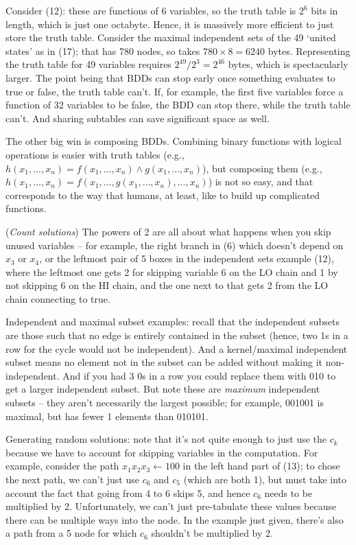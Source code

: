 Consider (12): these are functions of 6 variables, so the truth table is $2^6$ bits
in length, which is just one octabyte.  Hence, it is massively more efficient
to just store the truth table.  Consider the maximal independent sets of the
49 `united states' as in (17); that has 780 nodes, so takes $780 \times 8 = 6240$
bytes.  Representing the truth table for 49 variables requires $2^49 / 2^3 = 2^46$
bytes, which is spectacularly larger.  The point being that BDDs can stop early
once something evaluates to true or false, the truth table can't.  If, for example,
the first five variables force a function of 32 variables to be false, the BDD
can stop there, while the truth table can't.  And sharing subtables can save
significant space as well.

The other big win is composing BDDs.  Combining binary functions with
logical operations is easier with truth tables (e.g., $h\left(x_1, \ldots, x_n\right)
= f\left(x_1, \ldots, x_n\right) \land g\left(x_1, \ldots, x_n\right)$), but
composing them (e.g., $h\left(x_1, \ldots, x_n\right) = f\left(x_1, \ldots,
g\left(x_1, \ldots, x_n\right), \ldots, x_n\right)$) is not so easy, and 
that corresponds to the way that humans, at least, like to build up complicated
functions.

\vskip 0.08in  ({\it Count solutions})\hfil\break
The powers of 2 are all about what happens when you skip unused
variables -- for example, the right branch in (6) which doesn't depend
on $x_3$ or $x_4$, or the leftmost pair of 5 boxes in the independent
sets example (12), where the leftmost one gets 2 for skipping variable 6
on the LO chain and 1 by not skipping 6 on the HI chain, and the one
next to that gets 2 from the LO chain connecting to true.

\vskip 0.08in \noindent [p 208] Independent and maximal subset
examples: recall that the independent subsets are those such that
no edge is entirely contained in the subset (hence, two 1s in a row
for the cycle would not be independent).  And a kernel/maximal
independent subset means no element not in the subset can be
added without making it non-independent.   And if you had 3 0s in 
a row you could replace them with 010 to get a larger independent
subset.  But note these are {\it maximum} independent subsets -- 
they aren't necessarily the largest possible; for example, 001001
is maximal, but has fewer 1 elements than 010101.

\vskip 0.08in \noindent [p 208] Generating random solutions: note that
it's not quite enough to just use the $c_k$ because we have
to account for skipping variables in the computation.  For example,
consider the path $x_1 x_2 x_3 \gets 1 0 0$ in the left hand part
of (13); to chose the next path, we can't just use $c_6$ and $c_5$
(which are both 1), but must take into account the fact that
going from 4 to 6 skips 5, and hence $c_6$ needs to be multiplied
by 2.  Unfortunately, we can't just pre-tabulate these values because
there can be multiple ways into the node.  In the example just given,
there's also a path from a 5 node for which $c_6$ shouldn't be multiplied
by 2.

